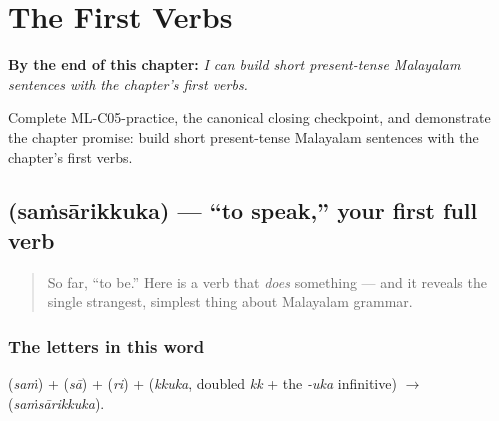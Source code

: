 
\chapter{The First Verbs}
\label{ch:first-verbs}

\begin{chapteropening}
\textbf{By the end of this chapter:} \emph{I can build short present-tense Malayalam sentences with the chapter's first verbs.}

Complete ML-C05-practice, the canonical closing checkpoint, and demonstrate the chapter promise: build short present-tense Malayalam sentences with the chapter's first verbs.
\end{chapteropening}

\section[\texorpdfstring{\ml{സംസാരിക്കുക} (saṁsārikkuka)}{സംസാരിക്കുക (saṁsārikkuka)}]{ (saṁsārikkuka) — \textquotedblleft{}to speak,\textquotedblright{} your first full verb}

\label{lesson:ML-C05-samsaarikkuka}



\begin{quote}
So far, \textquotedblleft{}to be.\textquotedblright{} Here is a verb that \emph{does} something — and it reveals the single strangest, simplest thing about Malayalam grammar.
\end{quote}

\subsection*{The letters in this word}
\textbf{} (\emph{saṁ}) + \textbf{} (\emph{sā}) + \textbf{} (\emph{ri}) + \textbf{} (\emph{kkuka}, doubled \emph{kk} + the \emph{-uka} infinitive) $\to$ \textbf{} (\emph{saṁsārikkuka}).

